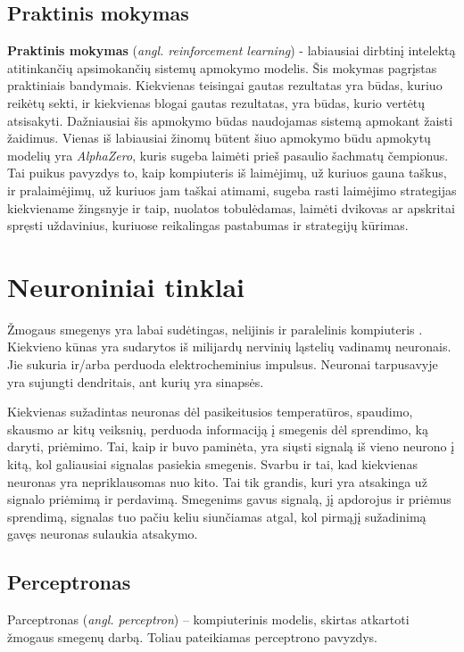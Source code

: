 \documentclass{VUMIFPSbakalaurinis}
\begin{document}
\subsection{Praktinis mokymas}
\textbf{Praktinis mokymas} (\textit{angl. reinforcement learning}) - labiausiai dirbtinį intelektą atitinkančių apsimokančių sistemų apmokymo modelis. Šis mokymas pagrįstas praktiniais bandymais. Kiekvienas teisingai gautas rezultatas yra būdas, kuriuo reikėtų sekti, ir kiekvienas blogai gautas rezultatas, yra būdas, kurio vertėtų atsisakyti. Dažniausiai šis apmokymo būdas naudojamas sistemą apmokant žaisti žaidimus. Vienas iš labiausiai žinomų būtent šiuo apmokymo būdu apmokytų modelių yra \textit{AlphaZero}, kuris sugeba laimėti prieš pasaulio šachmatų čempionus. Tai puikus pavyzdys to, kaip kompiuteris iš laimėjimų, už kuriuos gauna taškus, ir pralaimėjimų, už kuriuos jam taškai atimami, sugeba rasti laimėjimo strategijas kiekviename žingsnyje ir taip, nuolatos tobulėdamas, laimėti dvikovas ar apskritai spręsti uždavinius, kuriuose reikalingas pastabumas ir strategijų kūrimas.


\section{Neuroniniai tinklai}
Žmogaus smegenys yra labai sudėtingas, nelijinis ir paralelinis kompiuteris \cite{Hay09}. Kiekvieno kūnas yra sudarytos iš milijardų nervinių ląstelių vadinamų neuronais. Jie sukuria ir/arba perduoda elektrocheminius impulsus. Neuronai tarpusavyje yra sujungti dendritais, ant kurių yra sinapsės. 

Kiekvienas sužadintas neuronas dėl pasikeitusios temperatūros, spaudimo, skausmo ar kitų veiksnių, perduoda informaciją į smegenis dėl sprendimo, ką daryti, priėmimo. Tai, kaip ir buvo paminėta, yra siųsti signalą iš vieno neurono į kitą, kol galiausiai signalas pasiekia smegenis. Svarbu ir tai, kad kiekvienas neuronas yra nepriklausomas nuo kito. Tai tik grandis, kuri yra atsakinga už signalo priėmimą ir perdavimą. Smegenims gavus signalą, jį apdorojus ir priėmus sprendimą, signalas tuo pačiu keliu siunčiamas atgal, kol pirmąjį sužadinimą gavęs neuronas sulaukia atsakymo. 

\subsection{Perceptronas}

Parceptronas (\textit{angl. perceptron}) – kompiuterinis modelis, skirtas atkartoti žmogaus smegenų darbą. Toliau pateikiamas perceptrono pavyzdys.
\end{document}
